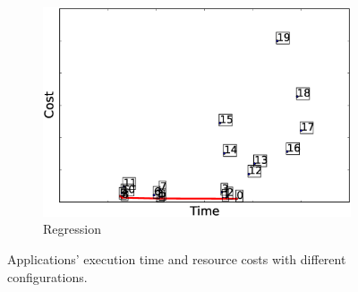 \begin{figure}
\begin{subfigure}[b]{0.3\textwidth}
        \includegraphics[width=\textwidth]{Chapter-CAT/figures/regression_elapsed_cost_all_frontier.eps}
        \caption{Regression}
        \label{fig:regression_configurations}
    \end{subfigure}
    \caption{Applications' execution time and resource costs with different configurations.}
    \label{fig:application_performance}
\end{figure}


